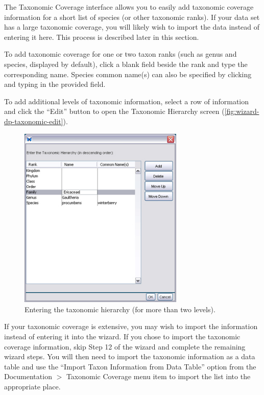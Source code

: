 The Taxonomic Coverage interface allows you to easily add taxonomic
coverage information for a short list of species (or other taxonomic
ranks). If your data set has a large taxonomic coverage, you will likely
wish to import the data instead of entering it here. This process is
described later in this section.

To add taxonomic coverage for one or two taxon ranks (such as genus and
species, displayed by default), click a blank field beside the rank and
type the corresponding name. Species common name(s) can also be
specified by clicking and typing in the provided field.

To add additional levels of taxonomic information, select a row of
information and click the ``Edit'' button to open the Taxonomic Hierarchy
screen (\autoref{fig:wizard-dp-taxonomic-edit}).

\begin{figure}
  \centering
    \includegraphics[width=0.7\textwidth]{images/wizard-dp-taxonomic-edit.jpg}
  \caption{Entering the taxonomic hierarchy (for more than two levels).}
  \label{fig:wizard-dp-taxonomic-edit}
\end{figure}

If your taxonomic coverage is extensive, you may wish to import the
information instead of entering it into the wizard. If you chose to
import the taxonomic coverage information, skip Step 12 of the wizard
and complete the remaining wizard steps. You will then need to import
the taxonomic information as a data table and use the ``Import Taxon
Information from Data Table'' option from the Documentation $>$
Taxonomic Coverage menu item to import the list into the appropriate
place. 

